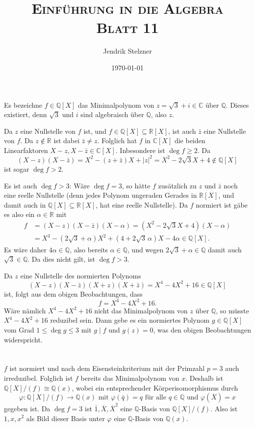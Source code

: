 \documentclass[a4paper,10pt]{article}
\title{\textsc{Einführung in die Algebra \\ \Large Blatt 11}}
\author{Jendrik Stelzner}
\date{\today}
\theoremstyle{definition}
\newcommand{\Q}{\mathbb{Q}}
\newcommand{\R}{\mathbb{R}}
\newcommand{\C}{\mathbb{C}}
\begin{document}
\maketitle





\section{}
Es bezeichne $f \in \Q[X]$ das Minimalpolynom von $z = \sqrt{3}+i \in \C$ über $\Q$. Dieses existiert, denn $\sqrt{3}$ und $i$ sind algebraisch über $\Q$, also $z$.

Da $z$ eine Nullstelle von $f$ ist, und $f \in \Q[X] \subseteq \R[X]$, ist auch $\bar{z}$ eine Nullstelle von $f$. Da $z \not\in \R$ ist dabei $\bar{z} \neq z$. Folglich hat $f$ in $\C[X]$ die beiden Linearfaktoren $X-z, X-\bar{z} \in \C[X]$. Inbesondere ist $\deg f \geq 2$. Da
\[
 (X-z)(X-\bar{z}) = X^2 -(z+\bar{z})X + |z|^2 = X^2 -2\sqrt{3}X + 4 \not\in \Q[X]
\]
ist sogar $\deg f > 2$.

Es ist auch $\deg f > 3$: Wäre $\deg f = 3$, so hätte $f$ zusätzlich zu $z$ und $\bar{z}$ noch eine reelle Nullstelle (denn jedes Polynom ungeraden Gerades in $\R[X]$, und damit auch in $\Q[X] \subseteq \R[X]$, hat eine reelle Nullstelle). Da $f$ normiert ist gäbe es also ein $\alpha \in \R$ mit
\begin{align*}
 f &= (X-z)(X-\bar{z})(X-\alpha) = (X^2 -2\sqrt{3}X + 4)(X-\alpha) \\
   &= X^3 - (2\sqrt{3}+\alpha)X^2 + (4+2\sqrt{3}\,\alpha)X -4\alpha \in \Q[X].
\end{align*}
Es wäre daher $4\alpha \in \Q$, also bereits $\alpha \in \Q$, und wegen $2\sqrt{3} + \alpha \in \Q$ damit auch $\sqrt{3} \in \Q$. Da dies nicht gilt, ist $\deg f > 3$.

Da $z$ eine Nullstelle des normierten Polynoms
\[
 (X-z)(X-\bar{z})(X+z)(X+\bar{z})
 = X^4 -4X^2 + 16 \in \Q[X]
\]
ist, folgt aus dem obigen Beobachtungen, dass
\[
 f = X^4 -4X^2 + 16.
\]
Wäre nämlich $X^4 -4X^2 + 16$ nicht das Minimalpolynom von $z$ über $\Q$, so müsste $X^4 -4X^2 + 16$ reduzibel sein. Dann gebe es ein normiertes Polynom $g \in \Q[X]$ vom Grad $1 \leq \deg g \leq 3$ mit $g \mid f$ und $g(z) = 0$, was den obigen Beobachtungen widerspricht.





\section{}
$f$ ist normiert und nach dem Eisensteinkriterium mit der Primzahl $p = 3$ auch irreduzibel. Folglich ist $f$ bereits das Minimalpolynom von $x$. Deshalb ist $\Q[X]/(f) \cong \Q(x)$, wobei ein entsprechender Körperisomorphismus durch
\[
 \varphi: \Q[X]/(f) \rightarrow \Q(x) \text{ mit }
 \varphi(\bar{q}) = q \text{ für alle } q \in \Q \text{ und }
 \varphi\left(\overline{X}\right) = x
\]
gegeben ist. Da $\deg f = 3$ ist $\bar{1}, \overline{X}, \overline{X}^2$ eine $\Q$-Basis von $\Q[X]/(f)$. Also ist $1, x, x^2$ als Bild dieser Basis unter $\varphi$ eine $\Q$-Basis von $\Q(x)$.
\end{document}
